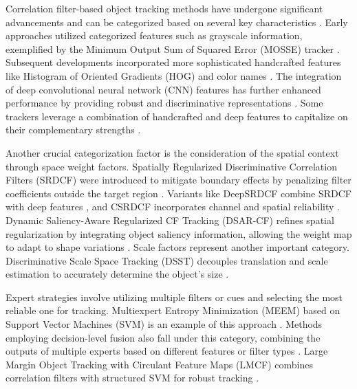 Correlation filter-based object tracking methods have undergone significant advancements and can be categorized based on several key characteristics \cite{du2021overview}. Early approaches utilized categorized features such as grayscale information, exemplified by the Minimum Output Sum of Squared Error (MOSSE) tracker \cite{feng2019dynamic}\cite{zhao2020correlation}\cite{lin2024motion}. Subsequent developments incorporated more sophisticated handcrafted features like Histogram of Oriented Gradients (HOG) and color names \cite{elmezain2025advancing}\cite{zhang2024webuot}\cite{feng2019dynamic}\cite{lin2024motion}. The integration of deep convolutional neural network (CNN) features has further enhanced performance by providing robust and discriminative representations \cite{feng2019dynamic}\cite{du2021overview}\cite{lin2024motion}. Some trackers leverage a combination of handcrafted and deep features to capitalize on their complementary strengths \cite{zhang2024webuot}\cite{du2021overview}\cite{lin2024motion}.

Another crucial categorization factor is the consideration of the spatial context through space weight factors. Spatially Regularized Discriminative Correlation Filters (SRDCF) were introduced to mitigate boundary effects by penalizing filter coefficients outside the target region \cite{du2021overview}\cite{feng2019dynamic}\cite{lin2024motion}. Variants like DeepSRDCF combine SRDCF with deep features \cite{feng2019dynamic}\cite{du2021overview}, and CSRDCF incorporates channel and spatial reliability \cite{feng2019dynamic}\cite{du2021overview}\cite{zhao2020correlation}. Dynamic Saliency-Aware Regularized CF Tracking (DSAR-CF) refines spatial regularization by integrating object saliency information, allowing the weight map to adapt to shape variations \cite{feng2019dynamic}\cite{du2021overview}\cite{lin2024motion}.
Scale factors represent another important category. Discriminative Scale Space Tracking (DSST) decouples translation and scale estimation to accurately determine the object's size \cite{zhang2024webuot}\cite{feng2019dynamic}\cite{lin2024motion}.

Expert strategies involve utilizing multiple filters or cues and selecting the most reliable one for tracking. Multiexpert Entropy Minimization (MEEM) based on Support Vector Machines (SVM) is an example of this approach \cite{du2021overview}\cite{srigowri2022enhancing}. Methods employing decision-level fusion also fall under this category, combining the outputs of multiple experts based on different features or filter types \cite{lin2024motion}\cite{elmezain2025advancing}. Large Margin Object Tracking with Circulant Feature Maps (LMCF) combines correlation filters with structured SVM for robust tracking \cite{feng2019dynamic}\cite{du2021overview}.

